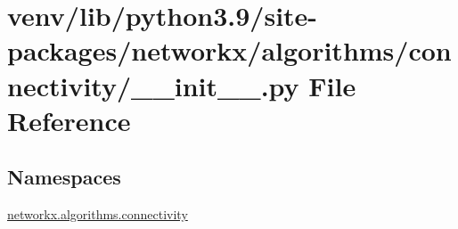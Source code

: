 \hypertarget{venv_2lib_2python3_89_2site-packages_2networkx_2algorithms_2connectivity_2____init_____8py}{}\section{venv/lib/python3.9/site-\/packages/networkx/algorithms/connectivity/\+\_\+\+\_\+init\+\_\+\+\_\+.py File Reference}
\label{venv_2lib_2python3_89_2site-packages_2networkx_2algorithms_2connectivity_2____init_____8py}
\subsection*{Namespaces}
\begin{DoxyCompactItemize}
\item 
 \hyperlink{namespacenetworkx_1_1algorithms_1_1connectivity}{networkx.\+algorithms.\+connectivity}
\end{DoxyCompactItemize}

